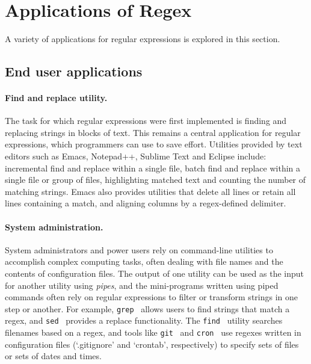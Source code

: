 \section{Applications of Regex}
\label{sec:applications}
A variety of applications for regular expressions is explored in this section.

\subsection{End user applications}
\paragraph{Find and replace utility.}  The task for which regular expressions were first implemented is finding and replacing strings in blocks of text.  This remains a central application for regular expressions, which programmers can use to save effort.  Utilities provided by text editors such as Emacs, Notepad++, Sublime Text and Eclipse include: incremental find and replace within a single file, batch find and replace within a single file or group of files, highlighting matched text and counting the number of matching strings.  Emacs also provides utilities that delete all lines or retain all lines containing a match, and aligning columns by a regex-defined delimiter.

\paragraph{System administration.}  System administrators and power users rely on command-line utilities to accomplish complex computing tasks, often dealing with file names and the contents of configuration files.  The output of one utility can be used as the input for another utility using \emph{pipes}, and the mini-programs written using piped commands often rely on regular expressions to filter or transform strings in one step or another.  For example, {\tt grep}~ allows users to find strings that match a regex, and {\tt sed}~ provides a replace functionality.  The {\tt find}~ utility searches filenames based on a regex, and tools like {\tt git}~ and {\tt cron}~ use regexes written in configuration files (`.gitignore' and `crontab', respectively) to specify sets of files or sets of dates and times.

